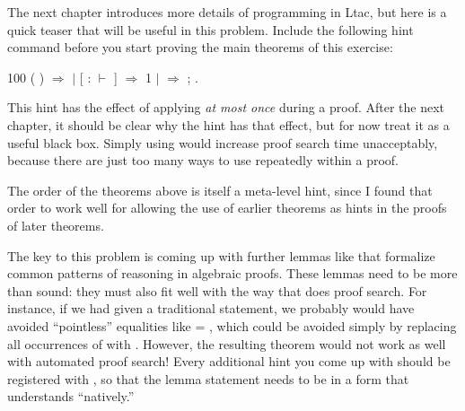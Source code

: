 \documentclass[12pt]{report}
\begin{document}
\begin{enumerate}
   The next chapter introduces more details of programming in Ltac, but here is a quick teaser that will be useful in this problem.  Include the following hint command before you start proving the main theorems of this exercise: \begin{coqdoccode}
\coqdocemptyline
\coqdocnoindent
{} 100 (\coqdocvar{\_}  \coqdocvar{\_}) \ensuremath{\Rightarrow}\coqdoceol
\coqdocindent{1.00em}
  \coqdoceol
\coqdocindent{2.00em}
\ensuremath{|} [ \coqdocvar{\_} :  \ensuremath{\vdash} \coqdocvar{\_} ] \ensuremath{\Rightarrow}  1\coqdoceol
\coqdocindent{2.00em}
\ensuremath{|} \coqdocvar{\_} \ensuremath{\Rightarrow}    ;  \coqdoceol
\coqdocindent{1.00em}
.\coqdoceol
\coqdocemptyline
\end{coqdoccode}
This hint has the effect of applying  \textit{at most once} during a proof.  After the next chapter, it should be clear why the hint has that effect, but for now treat it as a useful black box.  Simply using    would increase proof search time unacceptably, because there are just too many ways to use  repeatedly within a proof.


   The order of the theorems above is itself a meta-level hint, since I found that order to work well for allowing the use of earlier theorems as hints in the proofs of later theorems.


   The key to this problem is coming up with further lemmas like  that formalize common patterns of reasoning in algebraic proofs.  These lemmas need to be more than sound: they must also fit well with the way that  does proof search.  For instance, if we had given  a traditional statement, we probably would have avoided ``pointless'' equalities like  = , which could be avoided simply by replacing all occurrences of  with .  However, the resulting theorem would not work as well with automated proof search!  Every additional hint you come up with should be registered with  , so that the lemma statement needs to be in a form that  understands ``natively.''



\end{enumerate}
\end{document}
